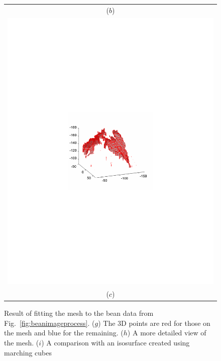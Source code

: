 \begin{figure}
\begin{center}
\begin{tabular}{c}
($b$) \\
\includegraphics[trim=190 280 190 290,clip,width=0.7\linewidth]{Figures/bean3DIsosurface} \\
($c$) \\
\end{tabular}
\end{center}
   \caption{ Result of fitting the mesh to the bean data from Fig.~\ref{fig:beanimageprocess}.  ($g$)  The $3$D points are red for those on the mesh and blue for the remaining.  ($h$) A more detailed view of the mesh. ($i$) A comparison with an isosurface created using marching cubes~\cite{} }
\label{fig:beanfit}
\end{figure}

